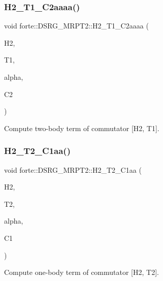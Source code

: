 \subsubsection{\texorpdfstring{H2\+\_\+\+T1\+\_\+\+C2aaaa()}{H2\_T1\_C2aaaa()}}
{\footnotesize\ttfamily void forte\+::\+D\+S\+R\+G\+\_\+\+M\+R\+P\+T2\+::\+H2\+\_\+\+T1\+\_\+\+C2aaaa (\begin{DoxyParamCaption}\item[{Blocked\+Tensor \&}]{H2,  }\item[{Blocked\+Tensor \&}]{T1,  }\item[{const double \&}]{alpha,  }\item[{Blocked\+Tensor \&}]{C2 }\end{DoxyParamCaption})\hspace{0.3cm}{\ttfamily [protected]}}



Compute two-\/body term of commutator \mbox{[}H2, T1\mbox{]}. 

\mbox{\label{classforte_1_1_d_s_r_g___m_r_p_t2_a927350265348432fed3dc13838860b38}} 
\subsubsection{\texorpdfstring{H2\+\_\+\+T2\+\_\+\+C1aa()}{H2\_T2\_C1aa()}}
{\footnotesize\ttfamily void forte\+::\+D\+S\+R\+G\+\_\+\+M\+R\+P\+T2\+::\+H2\+\_\+\+T2\+\_\+\+C1aa (\begin{DoxyParamCaption}\item[{Blocked\+Tensor \&}]{H2,  }\item[{Blocked\+Tensor \&}]{T2,  }\item[{const double \&}]{alpha,  }\item[{Blocked\+Tensor \&}]{C1 }\end{DoxyParamCaption})\hspace{0.3cm}{\ttfamily [protected]}}



Compute one-\/body term of commutator \mbox{[}H2, T2\mbox{]}. 

\mbox{\label{classforte_1_1_d_s_r_g___m_r_p_t2_a2b61743d0e4f4ebdedbe88a665256ec4}} 
